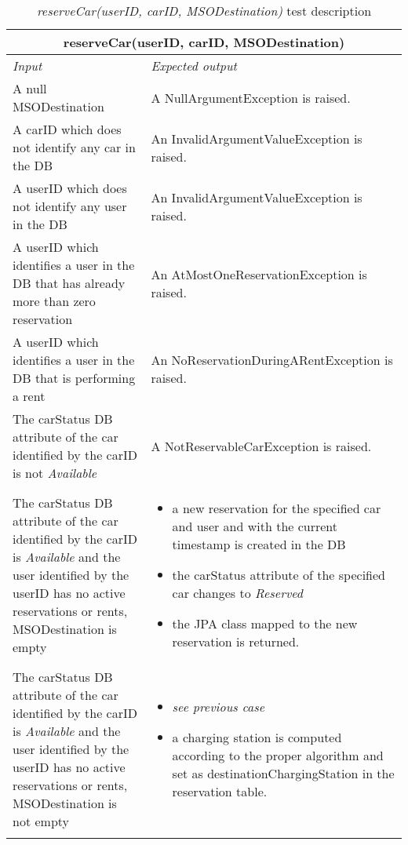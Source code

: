 \begin{longtable}{p{0.35\linewidth}p{0.65\linewidth}}
\multicolumn{2}{c}{\textbf{reserveCar(userID, carID, MSODestination)}} \\
\toprule
\emph{Input} & \emph{Expected output} \\
\midrule
A null MSODestination & A NullArgumentException is raised.\\
\midrule
A carID which does not identify any car in the DB & An InvalidArgumentValueException is raised.\\
\midrule
A userID which does not identify any user in the DB & An InvalidArgumentValueException is raised.\\
\midrule
A userID which identifies a user in the DB that has already more than zero reservation & An AtMostOneReservationException is raised. \\
\midrule
A userID which identifies a user in the DB that is performing a rent & An NoReservationDuringARentException is raised. \\
\midrule
The carStatus DB attribute of the car identified by the carID is not \emph{Available} & A NotReservableCarException is raised. \\
\midrule
The carStatus DB attribute of the car identified by the carID is \emph{Available} and the user identified by the userID has no active reservations or rents, MSODestination is empty & \begin{itemize}
	\item a new reservation for the specified car and user and with the current timestamp is created in the DB
	\item the carStatus attribute of the specified car changes to \emph{Reserved}
	\item the JPA class mapped to the new reservation is returned.
\end{itemize} \\
\midrule
The carStatus DB attribute of the car identified by the carID is \emph{Available} and the user identified by the userID has no active reservations or rents, MSODestination is not empty & \begin{itemize}
\item \emph{see previous case}
\item a charging station is computed according to the proper algorithm and set as destinationChargingStation in the reservation table.
\end{itemize}\\
\bottomrule
\caption{\emph{reserveCar(userID, carID, MSODestination)} test description}
\end{longtable}

